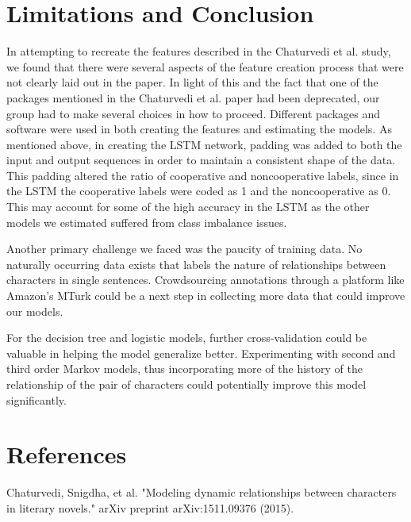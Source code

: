 \documentclass[11pt,a4paper]{article}
\begin{document}
\section{Limitations and Conclusion}

In attempting to recreate the features described in the Chaturvedi et al. study, we found that there were several aspects of the feature creation process that were not clearly laid out in the paper. In light of this and the fact that one of the packages mentioned in the Chaturvedi et al. paper had been deprecated, our group had to make several choices in how to proceed. Different packages and software were used in both creating the features and estimating the models.
As mentioned above, in creating the LSTM network, padding was added to both the input and output sequences in order to maintain a consistent shape of the data. This padding altered the ratio of cooperative and noncooperative labels, since in the LSTM the cooperative labels were coded as 1 and the noncooperative as 0. This may account for some of the high accuracy in the LSTM as the other models we estimated suffered from class imbalance issues.

Another primary challenge we faced was the paucity of training data. No naturally occurring data exists that labels the nature of relationships between characters in single sentences. Crowdsourcing annotations through a platform like Amazon’s MTurk could be a next step in collecting more data that could improve our models. 

For the decision tree and logistic models, further cross-validation could be valuable in helping the model generalize better. Experimenting with second and third order Markov models, thus incorporating more of the history of the relationship of the pair of characters could potentially improve this model significantly. 

\section{References}
Chaturvedi, Snigdha, et al. "Modeling dynamic relationships between characters in literary novels." arXiv preprint arXiv:1511.09376 (2015).



%
%
%
%
\end{document}
